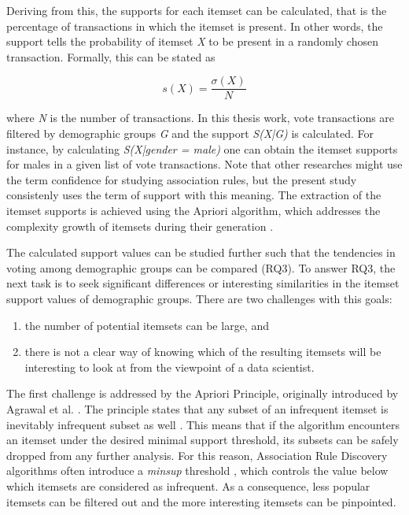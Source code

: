 Deriving from this, the supports for each itemset can be calculated, that is the percentage of transactions in which the itemset is present. In other words, the support tells the probability of itemset \emph{X} to be present in a randomly chosen transaction. Formally, this can be stated as 

\begin{equation}
    s(X) = \frac{\sigma (X)}{N}
\end{equation}

where \emph{N} is the number of transactions. In this thesis work, vote transactions are filtered by demographic groups \emph{G} and the support \emph{S(X|G)} is calculated. For instance, by calculating \emph{S(X|gender = male)} one can obtain the itemset supports for males in a given list of vote transactions. Note that other researches might use the term confidence for studying association rules, but the present study consistenly uses the term of support with this meaning. The extraction of the itemset supports is achieved using the Apriori algorithm, which addresses the complexity growth of itemsets during their generation \cite{introtodatamining}. 

The calculated support values can be studied further such that the tendencies in voting among demographic groups can be compared (RQ3). To answer RQ3, the next task is to seek significant differences or interesting similarities in the itemset support values of demographic groups. There are two challenges with this goals: 

\begin{enumerate}
    \item the number of potential itemsets can be large, and
    \item there is not a clear way of knowing which of the resulting itemsets will be interesting to look at from the viewpoint of a data scientist.
\end{enumerate} 

The first challenge is addressed by the Apriori Principle, originally introduced by Agrawal et al. \cite{agrawal1994fast}. The principle states that any subset of an infrequent itemset is inevitably infrequent subset as well \cite{agrawal1994fast, introtodatamining}. This means that if the algorithm encounters an itemset under the desired minimal support threshold, its subsets can be safely dropped from any further analysis. For this reason, Association Rule Discovery algorithms often introduce a \emph{minsup} threshold \cite{database_mining_agrawal, mining_association_rules_agrawal, introtodatamining}, which controls the value below which itemsets are considered as infrequent. As a consequence, less popular itemsets can be filtered out and the more interesting itemsets can be pinpointed. 

